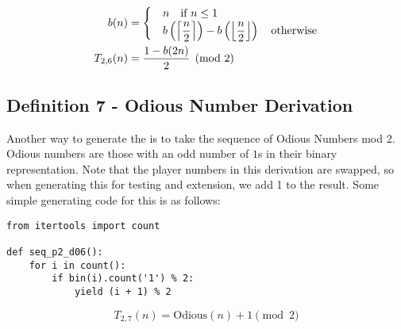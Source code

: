 \documentclass[conference]{IEEEtran}
\begin{document}
\begin{equation}
    \begin{aligned}
      b(n) &= \begin{cases}
          &n \quad \text{if } n \le 1 \\
          &b\left(\left\lceil \dfrac{n}{2} \right\rceil\right) - b\left(\left\lfloor \dfrac{n}{2} \right\rfloor\right) \quad \text{otherwise}
\end{cases} \\
T_{2,6}(n) &= \dfrac{1 - b(2n)}{2} \pmod{2}
    \end{aligned}
\end{equation}


\subsection{Definition 7 - Odious Number Derivation}


Another way to generate the \TMS is to take the sequence of Odious Numbers \cite{OEIS-Odious} mod $2$. Odious numbers are those with an odd number of $1$s in their binary representation. Note that the player numbers in this derivation are swapped, so when generating this for testing and extension, we add 1 to the result. Some simple generating code for this is as follows:

\begin{lstlisting}[style=pythonstyle]
from itertools import count

def seq_p2_d06():
    for i in count():
        if bin(i).count('1') % 2:
            yield (i + 1) % 2
\end{lstlisting}

\begin{equation}
T_{2,7}(n) = \text{Odious}(n) + 1 \pmod{2}
\end{equation}



\end{document}
